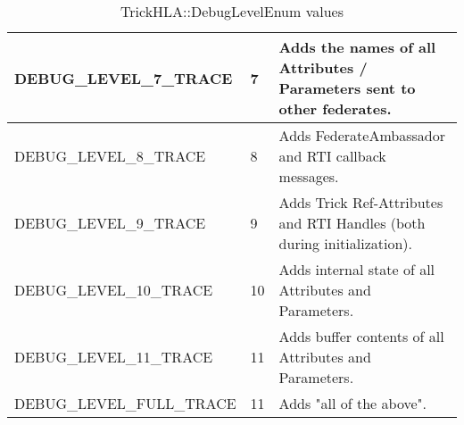 \begin{table}[ht]
\begin{center}
\begin{tabular}{|p{2in}|l|p{3.25in}|}
      \hline
      {\ttfamily DEBUG\_LEVEL\_7\_TRACE}
      & 7
      & Adds the names of all Attributes / Parameters sent to other federates.
      \\
      \hline
      {\ttfamily DEBUG\_LEVEL\_8\_TRACE}
      & 8
      & Adds FederateAmbassador and RTI callback messages.
      \\
      \hline
      {\ttfamily DEBUG\_LEVEL\_9\_TRACE}
      & 9
      & Adds Trick Ref-Attributes and RTI Handles (both during initialization).
      \\
      \hline
      {\ttfamily DEBUG\_LEVEL\_10\_TRACE}
      & 10
      & Adds internal state of all Attributes and Parameters.
      \\
      \hline
      {\ttfamily DEBUG\_LEVEL\_11\_TRACE}
      & 11
      & Adds buffer contents of all Attributes and Parameters.
      \\
      \hline
      {\ttfamily DEBUG\_LEVEL\_FULL\_TRACE}
      & 11
      & Adds "all of the above".
      \\
      \hline
    \end{tabular}
  \end{center}
  \caption{TrickHLA::DebugLevelEnum values}
  \label{tab:debug_levels}
\end{table}

